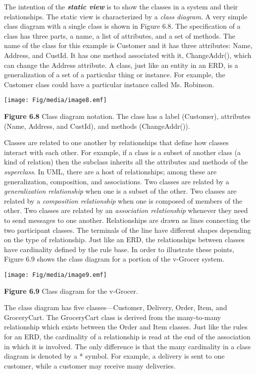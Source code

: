 The intention of the \emph{\textbf{static view}} is to show the classes
in a system and their relationships. The static view is characterized by
a \emph{class diagram}. A very simple class diagram with a single class
is shown in Figure 6.8. The specification of a class has three parts, a
name, a list of attributes, and a set of methods. The name of the class
for this example is Customer and it has three attributes: Name, Address,
and CustId. It has one method associated with it, ChangeAddr(), which
can change the Address attribute. A class, just like an entity in an
ERD, is a generalization of a set of a particular thing or instance. For
example, the Customer class could have a particular instance called Ms.
Robinson.

\texttt{[image: Fig/media/image8.emf]}

\textbf{Figure 6.8} Class diagram notation. The class has a label
(Customer), attributes (Name, Address, and CustId), and methods
(ChangeAddr()).

Classes are related to one another by relationships that define how
classes interact with each other. For example, if a class is a subset of
another class (a kind of relation) then the subclass inherits all the
attributes and methods of the \emph{superclass}. In UML, there are a
host of relationships; among these are generalization, composition, and
associations. Two classes are related by a \emph{generalization
relationship} when one is a subset of the other. Two classes are related
by a \emph{composition relationship} when one is composed of members of
the other. Two classes are related by an \emph{association relationship}
whenever they need to send messages to one another. Relationships are
drawn as lines connecting the two participant classes. The terminals of
the line have different shapes depending on the type of relationship.
Just like an ERD, the relationships between classes have cardinality
defined by the rule base. In order to illustrate these points, Figure
6.9 shows the class diagram for a portion of the v-Grocer system.

\texttt{[image: Fig/media/image9.emf]}

\textbf{Figure 6.9} Class diagram for the v-Grocer.

The class diagram has five classes---Customer, Delivery, Order, Item,
and GroceryCart. The GroceryCart class is derived from the many-to-many
relationship which exists between the Order and Item classes. Just like
the rules for an ERD, the cardinality of a relationship is read at the
end of the association in which it is involved. The only difference is
that the many cardinality in a class diagram is denoted by a * symbol.
For example, a delivery is sent to one customer, while a customer may
receive many deliveries.

